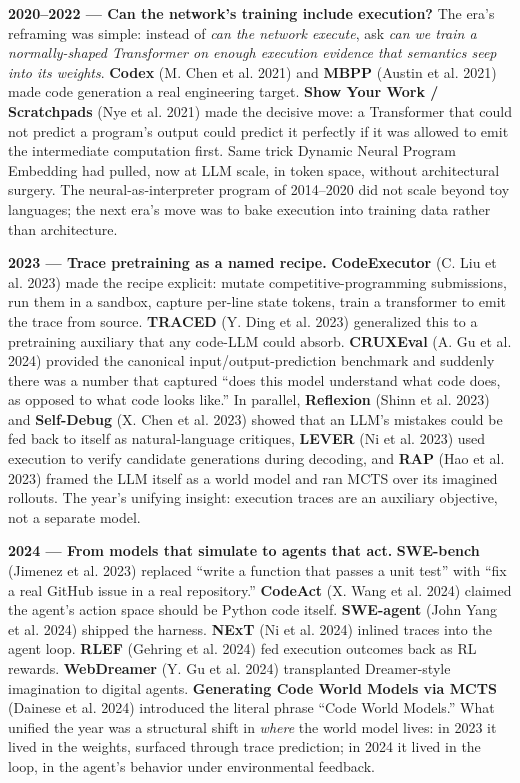 \documentclass{article}
\begin{document}
\textbf{2020--2022 --- Can the network's training include execution?}
The era's reframing was simple: instead of \emph{can the network
execute}, ask \emph{can we train a normally-shaped Transformer on enough
execution evidence that semantics seep into its weights}. \textbf{Codex}
(M. Chen et al. 2021) and \textbf{MBPP} (Austin et al. 2021) made code
generation a real engineering target. \textbf{Show Your Work /
Scratchpads} (Nye et al. 2021) made the decisive move: a Transformer
that could not predict a program's output could predict it perfectly if
it was allowed to emit the intermediate computation first. Same trick
Dynamic Neural Program Embedding had pulled, now at LLM scale, in token
space, without architectural surgery. The neural-as-interpreter program
of 2014--2020 did not scale beyond toy languages; the next era's move
was to bake execution into training data rather than architecture.

\textbf{2023 --- Trace pretraining as a named recipe.}
\textbf{CodeExecutor} (C. Liu et al. 2023) made the recipe explicit:
mutate competitive-programming submissions, run them in a sandbox,
capture per-line state tokens, train a transformer to emit the trace
from source. \textbf{TRACED} (Y. Ding et al. 2023) generalized this to a
pretraining auxiliary that any code-LLM could absorb. \textbf{CRUXEval}
(A. Gu et al. 2024) provided the canonical input/output-prediction
benchmark and suddenly there was a number that captured ``does this
model understand what code does, as opposed to what code looks like.''
In parallel, \textbf{Reflexion} (Shinn et al. 2023) and
\textbf{Self-Debug} (X. Chen et al. 2023) showed that an LLM's mistakes
could be fed back to itself as natural-language critiques,
\textbf{LEVER} (Ni et al. 2023) used execution to verify candidate
generations during decoding, and \textbf{RAP} (Hao et al. 2023) framed
the LLM itself as a world model and ran MCTS over its imagined rollouts.
The year's unifying insight: execution traces are an auxiliary
objective, not a separate model.

\textbf{2024 --- From models that simulate to agents that act.}
\textbf{SWE-bench} (Jimenez et al. 2023) replaced ``write a function
that passes a unit test'' with ``fix a real GitHub issue in a real
repository.'' \textbf{CodeAct} (X. Wang et al. 2024) claimed the agent's
action space should be Python code itself. \textbf{SWE-agent} (John Yang
et al. 2024) shipped the harness. \textbf{NExT} (Ni et al. 2024) inlined
traces into the agent loop. \textbf{RLEF} (Gehring et al. 2024) fed
execution outcomes back as RL rewards. \textbf{WebDreamer} (Y. Gu et al.
2024) transplanted Dreamer-style imagination to digital agents.
\textbf{Generating Code World Models via MCTS} (Dainese et al. 2024)
introduced the literal phrase ``Code World Models.'' What unified the
year was a structural shift in \emph{where} the world model lives: in
2023 it lived in the weights, surfaced through trace prediction; in 2024
it lived in the loop, in the agent's behavior under environmental
feedback.
\end{document}
